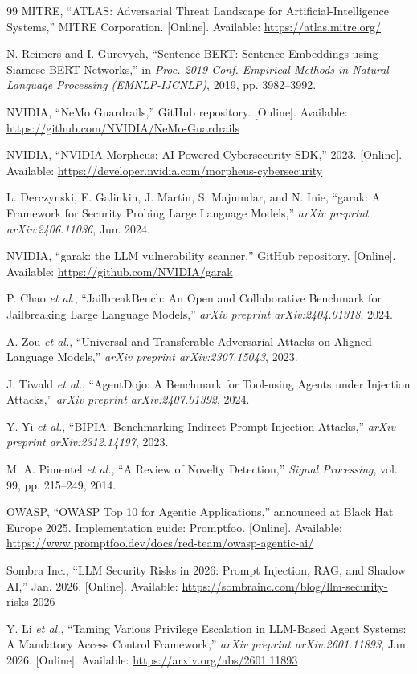 \documentclass[journal]{IEEEtran}
\begin{document}
\begin{thebibliography}{99}
MITRE, ``ATLAS: Adversarial Threat Landscape for Artificial-Intelligence Systems,'' MITRE Corporation. [Online]. Available: \url{https://atlas.mitre.org/}

N. Reimers and I. Gurevych, ``Sentence-BERT: Sentence Embeddings using Siamese BERT-Networks,'' in \textit{Proc. 2019 Conf. Empirical Methods in Natural Language Processing (EMNLP-IJCNLP)}, 2019, pp. 3982--3992.

NVIDIA, ``NeMo Guardrails,'' GitHub repository. [Online]. Available: \url{https://github.com/NVIDIA/NeMo-Guardrails}

NVIDIA, ``NVIDIA Morpheus: AI-Powered Cybersecurity SDK,'' 2023. [Online]. Available: \url{https://developer.nvidia.com/morpheus-cybersecurity}

L. Derczynski, E. Galinkin, J. Martin, S. Majumdar, and N. Inie, ``garak: A Framework for Security Probing Large Language Models,'' \textit{arXiv preprint arXiv:2406.11036}, Jun. 2024.

NVIDIA, ``garak: the LLM vulnerability scanner,'' GitHub repository. [Online]. Available: \url{https://github.com/NVIDIA/garak}

P. Chao \textit{et al.}, ``JailbreakBench: An Open and Collaborative Benchmark for Jailbreaking Large Language Models,'' \textit{arXiv preprint arXiv:2404.01318}, 2024.

A. Zou \textit{et al.}, ``Universal and Transferable Adversarial Attacks on Aligned Language Models,'' \textit{arXiv preprint arXiv:2307.15043}, 2023.

J. Tiwald \textit{et al.}, ``AgentDojo: A Benchmark for Tool-using Agents under Injection Attacks,'' \textit{arXiv preprint arXiv:2407.01392}, 2024.

Y. Yi \textit{et al.}, ``BIPIA: Benchmarking Indirect Prompt Injection Attacks,'' \textit{arXiv preprint arXiv:2312.14197}, 2023.

M. A. Pimentel \textit{et al.}, ``A Review of Novelty Detection,'' \textit{Signal Processing}, vol. 99, pp. 215--249, 2014.

OWASP, ``OWASP Top 10 for Agentic Applications,'' announced at Black Hat Europe 2025. Implementation guide: Promptfoo. [Online]. Available: \url{https://www.promptfoo.dev/docs/red-team/owasp-agentic-ai/}

Sombra Inc., ``LLM Security Risks in 2026: Prompt Injection, RAG, and Shadow AI,'' Jan. 2026. [Online]. Available: \url{https://sombrainc.com/blog/llm-security-risks-2026}

Y. Li \textit{et al.}, ``Taming Various Privilege Escalation in LLM-Based Agent Systems: A Mandatory Access Control Framework,'' \textit{arXiv preprint arXiv:2601.11893}, Jan. 2026. [Online]. Available: \url{https://arxiv.org/abs/2601.11893}

\end{thebibliography}


\end{document}
